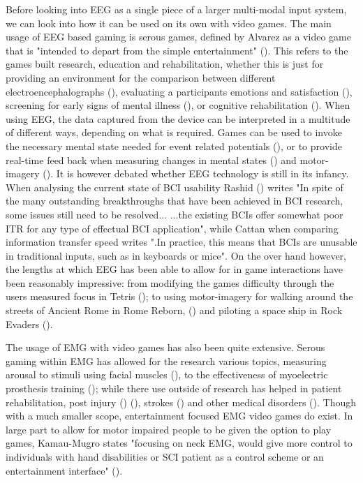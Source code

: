 \documentclass[11pt, a4paper]{article}
\newcommand{\citethis}[1]{(\cite{#1})}
\begin{document}
Before looking into EEG as a single piece of a larger multi-modal input system, we can look into how it can be used on its own with video games. The main usage of EEG based gaming is serous games, defined by Alvarez as a video game that is "intended to depart from the simple entertainment" \citethis{alvarez2011introduction}. This refers to the games built research, education and rehabilitation, whether this is just for providing an environment for the comparison between different electroencephalographs \citethis{liarokapis2014comparing}, evaluating a participants emotions and satisfaction \citethis{vourvopoulos2013brain}, screening for early signs of mental illness \citethis{tarnanas2015comparison}, or cognitive rehabilitation \citethis{alchalcabi2017more}. When using EEG, the data captured from the device can be interpreted in a multitude of different ways, depending on what is required. Games can be used to invoke the necessary mental state needed for event related potentials \citethis{ahn2011using}, or to provide real-time feed back when measuring changes in mental states \citethis{liarokapis2015examining} and motor-imagery \citethis{ndulue2019driving}. It is however debated whether EEG technology is still in its infancy. When analysing the current state of BCI usability Rashid \citethis{rashid2020current} writes "In spite of the many outstanding breakthroughs that have been achieved in BCI research, some issues still need to be resolved...  ...the existing BCIs offer somewhat poor ITR for any type of effectual BCI application", while Cattan when comparing information transfer speed writes ".In practice, this means that BCIs are unusable in traditional inputs, such as in keyboards or mice". On the over hand however, the lengths at which EEG has been able to allow for in game interactions have been reasonably impressive: from modifying the games difficulty through the users measured focus in Tetris \citethis{liarokapis2015examining}; to using motor-imagery for walking around the streets of Ancient Rome in Rome Reborn, \citethis{ndulue2019driving} and piloting a space ship in Rock Evaders \citethis{ndulue2019driving}.

\hfill

The usage of EMG with video games has also been quite extensive. Serous gaming within EMG has allowed for the research various topics, measuring arousal to stimuli using facial muscles \citethis{schuurink2008engagement}, to the effectiveness of myoelectric prosthesis training \citethis{bessa2020designing}; while there use outside of research has helped in patient rehabilitation, post injury \citethis{gutierrez2020serious} \citethis{schonauer2011full}, strokes \citethis{ghassemi2019development} and other medical disorders \citethis{labruyere2013requirements}. Though with a much smaller scope, entertainment focused EMG video games do exist. In large part to allow for motor impaired people to be given the option to play games, Kamau-Mugro states "focusing on neck EMG, would give more control to individuals with hand disabilities or SCI patient as a control scheme or an entertainment interface" \citethis{muguro2020development}.
\end{document}
